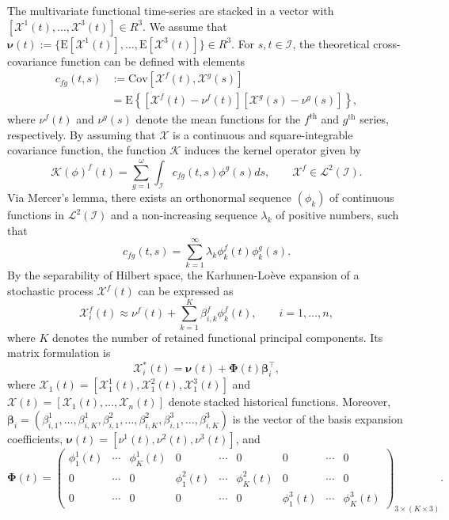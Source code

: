 \documentclass[12pt,a4paper]{article}
\newcommand{\X}{\mathcal{X}}
\begin{document}
The multivariate functional time-series are stacked in a vector with $[\X^{1}(t),\dots,\X^{3}(t)]\in R^{3}$. We assume that $\bm{\nu}(t):=\{\text{E}[\X^{1}(t)], \dots, \text{E}[\X^{3}(t)]\}\in R^{3}$. For $s, t\in \mathcal{I}$, the theoretical cross-covariance function can be defined with elements
\begin{align*}
c_{fg}(t, s) &:= \text{Cov}\left[\X^{f}(t), \X^{g}(s)\right] \\
&=\text{E}\left\{\left[\X^{f}(t) - \nu^{f}(t)\right]\left[\X^{g}(s) - \nu^{g}(s)\right]\right\},
\end{align*}
where $\nu^{f}(t)$ and $\nu^{g}(s)$ denote the mean functions for the $f^{\text{th}}$ and $g^{\text{th}}$ series, respectively. By assuming that $\X$ is a continuous and square-integrable covariance function, the function $\mathcal{K}$ induces the kernel operator given by
\begin{equation*}
\mathcal{K}(\phi)^{f}(t) = \sum^{\omega}_{g=1}\int_{\mathcal{I}}c_{fg}(t,s)\phi^{g}(s)ds, \qquad \X^{f}\in \mathcal{L}^2(\mathcal{I}).
\end{equation*}
Via Mercer's lemma, there exists an orthonormal sequence $(\phi_k)$ of continuous functions in $\mathcal{L}^2(\mathcal{I})$ and a non-increasing sequence $\lambda_k$ of positive numbers, such that
\begin{equation*}
c_{fg}(t,s) = \sum^{\infty}_{k=1}\lambda_k \phi_k^{f}(t)\phi_k^{g}(s).
\end{equation*}
By the separability of Hilbert space, the Karhunen-Lo\`{e}ve expansion of a stochastic process $\X^{f}(t)$ can be expressed as
\begin{equation*}
\X_i^{f}(t) \approx \nu^{f}(t) + \sum^{K}_{k=1}\beta_{i,k}^{f}\phi_k^{f}(t),\qquad i=1,\dots,n,
\end{equation*}
where $K$ denotes the number of retained functional principal components. Its matrix formulation is
\begin{equation*}
\bm{\X}^*_i(t) = \bm{\nu}(t) + \bm{\Phi}(t)\bm{\beta}_i^{\top},
\end{equation*}
where $\bm{\X}_1(t) = [\X_1^1(t),\X_1^2(t),\X_1^{3}(t)]$ and $\bm{\X}(t)=[\bm{\X}_1(t),\dots,\bm{\X}_n(t)]$ denote stacked historical functions. Moreover, $\bm{\beta}_i = \left(\beta_{i,1}^{1},\dots,\beta_{i,K}^{1}, \beta_{i,1}^{2},\dots,\beta_{i,K}^{2}, \beta_{i,1}^{3},\dots,\beta_{i,K}^{3}\right)$ is the vector of the basis expansion coefficients, $\bm{\nu}(t) = [\nu^{1}(t), \nu^{2}(t), \nu^{3}(t)]$, and
\begin{equation*}
\bm{\Phi}(t) = \left( \begin{array}{ccccccccc}
\phi_1^{1}(t) & \cdots & \phi_{K}^{1}(t) & 0 & \cdots & 0 & 0 & \cdots & 0 \\
0 & \cdots & 0 & \phi_1^{2}(t) & \cdots & \phi_{K}^{2}(t) & 0 & \cdots & 0 \\
 0 & \cdots & 0 & 0 & \cdots & 0 & \phi_1^{3}(t) & \cdots & \phi_{K}^{3}(t)  \end{array} \right)_{3\times (K\times 3)}.
\end{equation*}
\end{document}
